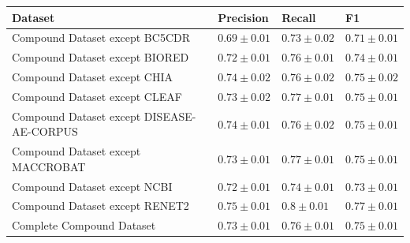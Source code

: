\begin{tabular}{llll}
\toprule
Dataset & Precision & Recall & F1 \\
\midrule
Compound Dataset except BC5CDR & $0.69 \pm 0.01$ & $0.73 \pm 0.02$ & $0.71 \pm 0.01$ \\
Compound Dataset except BIORED & $0.72 \pm 0.01$ & $0.76 \pm 0.01$ & $0.74 \pm 0.01$ \\
Compound Dataset except CHIA & $0.74 \pm 0.02$ & $0.76 \pm 0.02$ & $0.75 \pm 0.02$ \\
Compound Dataset except CLEAF & $0.73 \pm 0.02$ & $0.77 \pm 0.01$ & $0.75 \pm 0.01$ \\
Compound Dataset except DISEASE-AE-CORPUS & $0.74 \pm 0.01$ & $0.76 \pm 0.02$ & $0.75 \pm 0.01$ \\
Compound Dataset except MACCROBAT & $0.73 \pm 0.01$ & $0.77 \pm 0.01$ & $0.75 \pm 0.01$ \\
Compound Dataset except NCBI & $0.72 \pm 0.01$ & $0.74 \pm 0.01$ & $0.73 \pm 0.01$ \\
Compound Dataset except RENET2 & $0.75 \pm 0.01$ & $0.8 \pm 0.01$ & $0.77 \pm 0.01$ \\
Complete Compound Dataset & $0.73 \pm 0.01$ & $0.76 \pm 0.01$ & $0.75 \pm 0.01$ \\
\bottomrule
\end{tabular}
